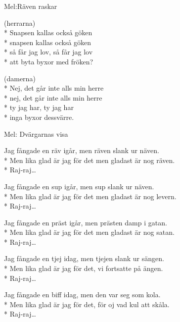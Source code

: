 \begin{SongText}[Göken]
    \begin{SongInfo}
        Mel:Räven raskar
    \end{SongInfo}
    \begin{SongVerse}
        (herrarna)\\*%
        Snapsen kallas också göken\\*%
        snapsen kallas också göken\\*%
        så får jag lov, så får jag lov\\*%
        att byta byxor med fröken?
    \end{SongVerse}
    \begin{SongVerse}
        (damerna)\\*%
        Nej, det går inte alls min herre\\*%
        nej, det går inte alls min herre\\*%
        ty jag har, ty jag har\\*%
        inga byxor dessvärre.
    \end{SongVerse}
\end{SongText}
\begin{SongText}[Räven v2]
    \begin{SongInfo}
        Mel: Dvärgarnas visa
    \end{SongInfo}
    \begin{SongVerse}
        Jag fångade en räv igår, men räven slank ur näven.\\*%
        Men lika glad är jag för det men gladast är nog räven.\\*%
        Raj-raj…
    \end{SongVerse}
    \begin{SongVerse}
        Jag fångade en sup igår, men sup slank ur näven.\\*%
        Men lika glad är jag för det men gladast är nog levern.\\*%
        Raj-raj…
    \end{SongVerse}
    \begin{SongVerse}
        Jag fångade en präst igår, men prästen damp i gatan.\\*%
        Men lika glad är jag för det men gladast är nog satan.\\*%
        Raj-raj…
    \end{SongVerse}
    \begin{SongVerse}
        Jag fångade en tjej idag, men tjejen slank ur sängen.\\*%
        Men lika glad är jag för det, vi fortsatte på ängen.\\*%
        Raj-raj…
    \end{SongVerse}
    \begin{SongVerse}
        Jag fångade en biff idag, men den var seg som kola.\\*%
        Men lika glad är jag för det, för oj vad kul att skåla.\\*%
        Raj-raj…
    \end{SongVerse}
\end{SongText}
